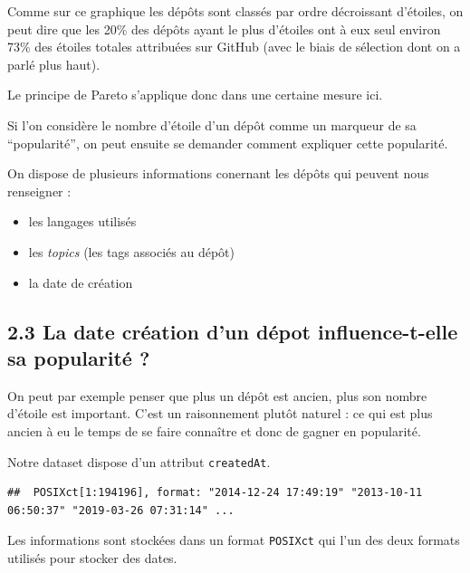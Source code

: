 \documentclass[
]{article}
\newenvironment{Shaded}{\begin{snugshade}}{\end{snugshade}}
\newcommand{\FunctionTok}[1]{\textcolor[rgb]{0.13,0.29,0.53}{\textbf{#1}}}
\newcommand{\NormalTok}[1]{#1}
\newcommand{\SpecialCharTok}[1]{\textcolor[rgb]{0.81,0.36,0.00}{\textbf{#1}}}
\providecommand{\tightlist}{%
  \setlength{\itemsep}{0pt}\setlength{\parskip}{0pt}}
\begin{document}
Comme sur ce graphique les dépôts sont classés par ordre décroissant
d'étoiles, on peut dire que les 20\% des dépôts ayant le plus d'étoiles
ont à eux seul environ 73\% des étoiles totales attribuées sur GitHub
(avec le biais de sélection dont on a parlé plus haut).

Le principe de Pareto s'applique donc dans une certaine mesure ici.

Si l'on considère le nombre d'étoile d'un dépôt comme un marqueur de sa
``popularité'', on peut ensuite se demander comment expliquer cette
popularité.

On dispose de plusieurs informations conernant les dépôts qui peuvent
nous renseigner :

\begin{itemize}
\tightlist
\item
  les langages utilisés
\item
  les \emph{topics} (les tags associés au dépôt)
\item
  la date de création
\end{itemize}

\subsection{2.3 La date création d'un dépot influence-t-elle sa
popularité
?}\label{la-date-cruxe9ation-dun-duxe9pot-influence-t-elle-sa-popularituxe9}

On peut par exemple penser que plus un dépôt est ancien, plus son nombre
d'étoile est important. C'est un raisonnement plutôt naturel : ce qui
est plus ancien à eu le temps de se faire connaître et donc de gagner en
popularité.

Notre dataset dispose d'un attribut \texttt{createdAt}.

\begin{Shaded}
\end{Shaded}

\begin{verbatim}
##  POSIXct[1:194196], format: "2014-12-24 17:49:19" "2013-10-11 06:50:37" "2019-03-26 07:31:14" ...
\end{verbatim}

Les informations sont stockées dans un format \texttt{POSIXct} qui l'un
des deux formats utilisés pour stocker des dates.
\end{document}
